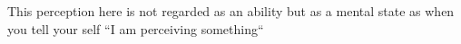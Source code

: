 \documentclass[a4paper]{article}
\title{}
\date{}
\begin{document}
    \maketitle
    This perception here is not regarded as an ability but as a mental state as when you tell your self ``I am perceiving something``
\end{document}
